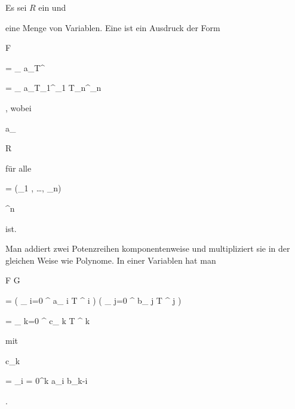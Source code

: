 {


Es sei $R$ ein
und

 eine Menge von Variablen. Eine  ist ein Ausdruck der Form


\mavergleichskettedisp

{\vergleichskette

{ F
}

{ =} { \sum_{\nu} a_\nu T^\nu
}

{ =} { \sum_{\nu} a_\nu T_1^{\nu_1 } \cdots T_n^{\nu_n }
}

{ } {
}

{ } {
}

}
{}{}{,}
wobei


\mavergleichskette

{\vergleichskette

{  a_\nu
}

{ \in }{ R
}

{  }{
}

{    }{
}

{   }{
}

}
{}{}{}
für alle


\mavergleichskette

{\vergleichskette

{ \nu
}

{ = }{ (\nu_1 , \ldots , \nu_n)
}

{ \in }{ \N^n
}

{    }{
}

{   }{
}

}
{}{}{}
ist.


}


Man addiert zwei Potenzreihen komponentenweise und multipliziert sie in der gleichen Weise wie Polynome. In einer Variablen hat man


\mavergleichskettedisp

{\vergleichskette

{ F \cdot G
}

{ =} { \left(  {\sum }_{ i=0 }^{ \infty } a_{ i } T ^{ i }  \right) \left(  {\sum }_{ j=0 }^{ \infty } b_{ j } T ^{ j }  \right)
}

{ =} { {\sum }_{ k=0 }^{ \infty } c_{ k } T ^{ k }
}

{ } {
}

{ } {
}

}
{}{}{}
mit


\mavergleichskette

{\vergleichskette

{ c_k
}

{ = }{ \sum_{i = 0}^k a_i b_{k-i}
}

{  }{
}

{    }{
}

{   }{
}

}
{}{}{.}


